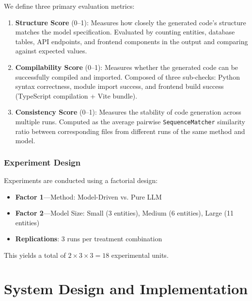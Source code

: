 \documentclass[11pt,a4paper]{article}
\begin{document}
We define three primary evaluation metrics:

\begin{enumerate}[leftmargin=*]
    \item \textbf{Structure Score} (0--1): Measures how closely the generated code's structure matches the model specification. Evaluated by counting entities, database tables, API endpoints, and frontend components in the output and comparing against expected values.

    \item \textbf{Compilability Score} (0--1): Measures whether the generated code can be successfully compiled and imported. Composed of three sub-checks: Python syntax correctness, module import success, and frontend build success (TypeScript compilation + Vite bundle).

    \item \textbf{Consistency Score} (0--1): Measures the stability of code generation across multiple runs. Computed as the average pairwise {\lstinline|SequenceMatcher|} similarity ratio between corresponding files from different runs of the same method and model.
\end{enumerate}

\subsubsection{Experiment Design}

Experiments are conducted using a factorial design:

\begin{itemize}
    \item \textbf{Factor 1}---Method: Model-Driven vs. Pure LLM
    \item \textbf{Factor 2}---Model Size: Small (3 entities), Medium (6 entities), Large (11 entities)
    \item \textbf{Replications}: 3 runs per treatment combination
\end{itemize}

This yields a total of $2 \times 3 \times 3 = 18$ experimental units.

\newpage
\section{System Design and Implementation}
\label{sec:design}
\end{document}
